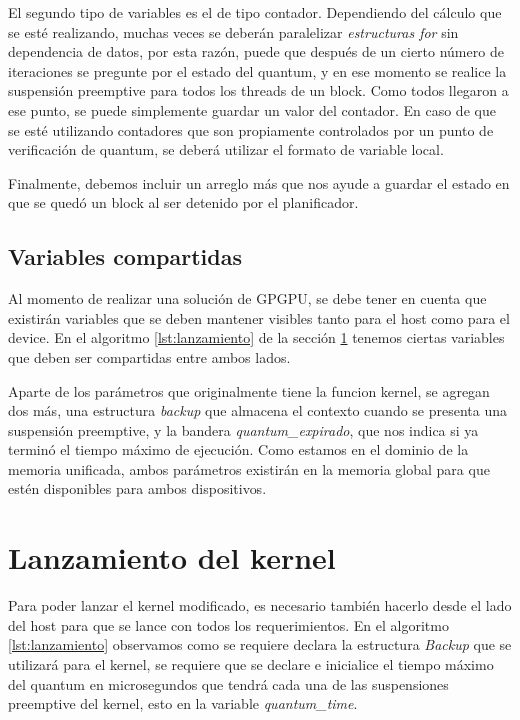 El segundo tipo de variables es el de tipo contador. Dependiendo del cálculo que se esté realizando, muchas veces se deberán paralelizar \textit{estructuras for} sin dependencia de datos, por esta razón, puede que después de un cierto número de iteraciones se pregunte por el estado del quantum, y en ese momento se realice la suspensión preemptive para todos los threads de un block. Como todos llegaron a ese punto, se puede simplemente guardar un valor del contador. En caso de que se esté utilizando contadores que son propiamente controlados por un punto de verificación de quantum, se deberá utilizar el formato de variable local.
\newline

Finalmente, debemos incluir un arreglo más que nos ayude a guardar el estado en que se quedó un block al ser detenido por el planificador.



  \subsection{Variables compartidas}
  
  Al momento de realizar una solución de GPGPU, se debe tener en cuenta que existirán variables que se deben mantener visibles tanto para el host como para el device. En el algoritmo \ref{lst:lanzamiento} de la sección \ref{secc:lanzamientoKernel} tenemos ciertas variables que deben ser compartidas entre ambos lados. 
  \newline
  
  Aparte de los parámetros que originalmente tiene la funcion kernel, se agregan dos más, una estructura \textit{backup} que almacena el contexto cuando se presenta una suspensión preemptive, y la bandera \textit{quantum\_expirado}, que nos indica si ya terminó el tiempo máximo de ejecución. Como estamos en el dominio de la memoria unificada, ambos parámetros existirán en la memoria global para que estén disponibles para ambos dispositivos.
  
  

\section{Lanzamiento del kernel}\label{secc:lanzamientoKernel}

Para poder lanzar el kernel modificado, es necesario también hacerlo desde el lado del host para que se lance con todos los requerimientos. En el algoritmo \ref{lst:lanzamiento} observamos como se requiere declara la estructura \textit{Backup} que se utilizará para el kernel, se requiere que se declare e inicialice el tiempo máximo del quantum en microsegundos que tendrá cada una de las suspensiones preemptive del kernel, esto en la variable \textit{quantum\_time}.
\newline

